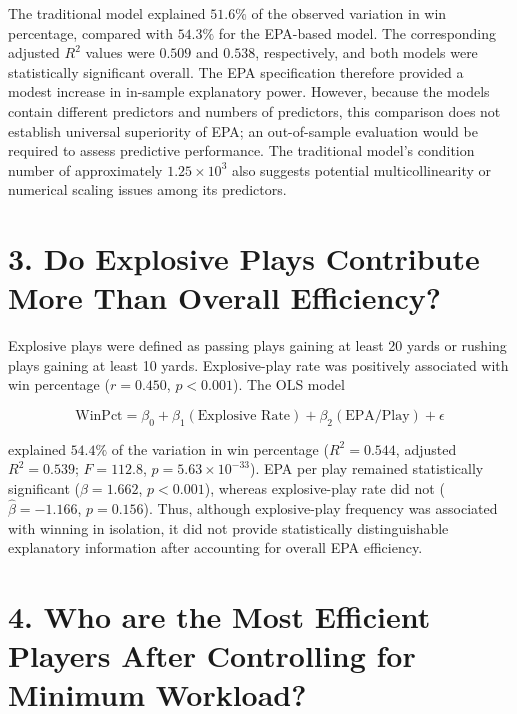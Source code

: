 \documentclass[11pt]{article}
\begin{document}
The traditional model explained $51.6\%$ of the observed variation in win percentage, compared with $54.3\%$ for the EPA-based model. The corresponding adjusted $R^2$ values were $0.509$ and $0.538$, respectively, and both models were statistically significant overall. The EPA specification therefore provided a modest increase in in-sample explanatory power. However, because the models contain different predictors and numbers of predictors, this comparison does not establish universal superiority of EPA; an out-of-sample evaluation would be required to assess predictive performance. The traditional model's condition number of approximately $1.25\times10^3$ also suggests potential multicollinearity or numerical scaling issues among its predictors.



\section*{3. Do Explosive Plays Contribute More Than Overall Efficiency?}

Explosive plays were defined as passing plays gaining at least 20 yards or rushing plays gaining at least 10 yards. Explosive-play rate was positively associated with win percentage ($r=0.450$, $p<0.001$). The OLS model

\begin{equation}
    \text{WinPct}
    =
    \beta_0+
    \beta_1(\text{Explosive Rate})+
    \beta_2(\text{EPA/Play})+
    \epsilon
\end{equation}

explained $54.4\%$ of the variation in win percentage ($R^2=0.544$, adjusted $R^2=0.539$; $F=112.8$, $p=5.63\times10^{-33}$). EPA per play remained statistically significant ($\hat{\beta}=1.662$, $p<0.001$), whereas explosive-play rate did not ($\hat{\beta}=-1.166$, $p=0.156$). Thus, although explosive-play frequency was associated with winning in isolation, it did not provide statistically distinguishable explanatory information after accounting for overall EPA efficiency.



\section*{4. Who are the Most Efficient Players After Controlling for Minimum Workload?}
\end{document}
